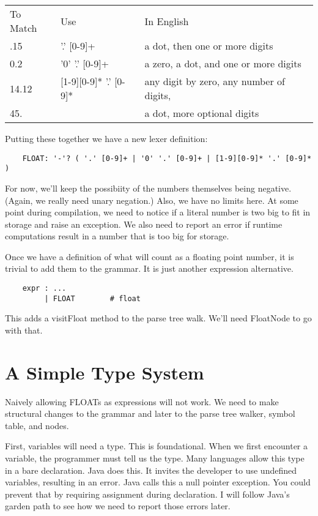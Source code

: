 \begin{tabular}{l l l}
To Match  & Use                    & In English \\
.15       & '.' [0-9]+             & a dot, then one or more digits \\
0.2       & '0' '.' [0-9]+         & a zero, a dot, and one or more digits \\
14.12     & [1-9][0-9]* '.' [0-9]* & any digit by zero, any number of digits, \\
45.       &                        & a dot, more optional digits \\
\end{tabular}

Putting these together we have a new lexer definition:

{\footnotesize
\begin{verbatim}
    FLOAT: '-'? ( '.' [0-9]+ | '0' '.' [0-9]+ | [1-9][0-9]* '.' [0-9]* )
\end{verbatim}
}

For now, we'll keep the possibiity of the numbers themselves being
negative. (Again, we really need unary negation.) Also, we have
no limits here. At some point during compilation, we need to notice
if a literal number is two big to fit in storage and raise an exception.
We also need to report an error if runtime computations result
in a number that is too big for storage.

Once we have a definition of what will count as a floating point
number, it is trivial to add them to the grammar. It is just another
expression alternative.

{\footnotesize
\begin{verbatim}
    expr : ...
         | FLOAT        # float
\end{verbatim}
}

This adds a visitFloat method to the parse tree walk. We'll need FloatNode
to go with that.

\section{A Simple Type System}

Naively allowing FLOATs as expressions will not work. We need to make
structural changes to the grammar and later to the parse tree walker,
symbol table, and nodes.

First, variables will need a type. This is foundational. When we first
encounter a variable, the programmer must tell us the type. Many languages
allow this type in a bare declaration. Java does this. It invites the
developer to use undefined variables, resulting in an error. Java calls
this a null pointer exception. You could prevent that by requiring
assignment during declaration. I will follow Java's garden path to
see how we need to report those errors later.

